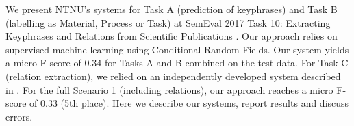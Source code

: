 We present NTNU's systems for Task A (prediction of keyphrases) and Task B (labelling as Material, Process or Task) at SemEval 2017 Task 10: Extracting Keyphrases and Relations from Scientific Publications \cite{augenstein2017scienceie}. Our approach relies on supervised machine learning using Conditional Random Fields. Our system yields a micro F-score of 0.34 for Tasks A and B combined on the test data. For Task C (relation extraction), we relied on an independently developed system described in \cite{Barik:2017}. For the full Scenario 1 (including relations), our approach reaches a micro F-score of 0.33 (5th place). Here we describe our systems, report results and discuss errors.
